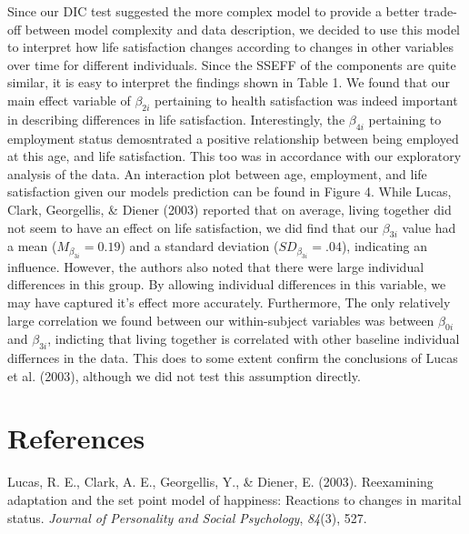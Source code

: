 \documentclass[man]{apa6}
\theoremstyle{definition}
\theoremstyle{definition}
\theoremstyle{definition}
\theoremstyle{remark}
\begin{document}
Since our DIC test suggested the more complex model to provide a better
trade-off between model complexity and data description, we decided to
use this model to interpret how life satisfaction changes according to
changes in other variables over time for different individuals. Since
the SSEFF of the components are quite similar, it is easy to interpret
the findings shown in Table 1. We found that our main effect variable of
\(\beta_{2i}\) pertaining to health satisfaction was indeed important in
describing differences in life satisfaction. Interestingly, the
\(\beta_{4i}\) pertaining to employment status demosntrated a positive
relationship between being employed at this age, and life satisfaction.
This too was in accordance with our exploratory analysis of the data. An
interaction plot between age, employment, and life satisfaction given
our models prediction can be found in Figure 4. While Lucas, Clark,
Georgellis, \& Diener (2003) reported that on average, living together
did not seem to have an effect on life satisfaction, we did find that
our \(\beta_{3i}\) value had a mean (\(M_{\beta_{3i}} = 0.19\)) and a
standard deviation (\(SD_{\beta_{3i}} = .04\)), indicating an influence.
However, the authors also noted that there were large individual
differences in this group. By allowing individual differences in this
variable, we may have captured it's effect more accurately. Furthermore,
The only relatively large correlation we found between our
within-subject variables was between \(\beta_{0i}\) and \(\beta_{3i}\),
indicting that living together is correlated with other baseline
individual differnces in the data. This does to some extent confirm the
conclusions of Lucas et al. (2003), although we did not test this
assumption directly.

\newpage

\hypertarget{references}{%
\section{References}\label{references}}

\begingroup
\setlength{\parindent}{-0.5in}
\setlength{\leftskip}{0.5in}

\hypertarget{refs}{}
\leavevmode\hypertarget{ref-lucas2003reexamining}{}%
Lucas, R. E., Clark, A. E., Georgellis, Y., \& Diener, E. (2003).
Reexamining adaptation and the set point model of happiness: Reactions
to changes in marital status. \emph{Journal of Personality and Social
Psychology}, \emph{84}(3), 527.

\endgroup
\end{document}
